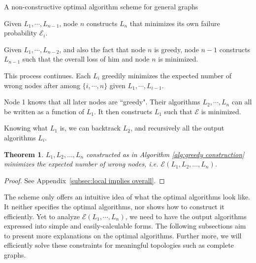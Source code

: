 \documentclass[a4paper,UKenglish]{lipics}
\newtheorem{thm}{Theorem}[section] %
\theoremstyle{definition}
\begin{document}
\begin{algorithm}[htb]
\caption{A non-constructive optimal algorithm scheme for general graphs}
\begin{algorithmic}[1]
\label{alg:greedy construction}
\STATE Given $L_1, \dotsb, L_{n-1}$, node $n$ constructs $L_n$ that minimizes its own failure probability $\mathcal{E}_i$.

\STATE Given $L_1, \dotsb, L_{n-2}$, and also the fact that node $n$ is greedy,
		 node $n - 1$ constructs $L_{n-1}$ such that the overall loss of him and node $n$ is minimized.

\STATE This process continues. Each $L_i$ greedily minimizes the expected number of wrong nodes after among $\{i, \dotsb, n\}$
		 given $L_1, \dotsb, L_{i-1}$. 

\STATE Node 1 knows that all later nodes are ``greedy".
	Their algorithms $L_2, \dotsb, L_n$ can all be written as a function of $L_1$. 
	It then constructs $L_1$ such that $\mathcal{E}$ is minimized.

\STATE Knowing what $L_1$ is, we can backtrack $L_2$, and recursively all the output algorithms $L_i$.
\end{algorithmic}
\end{algorithm}

\begin{thm}
\label{local implies overall}
$L_1, L_2, \dots, L_n$ constructed as in Algorithm \ref{alg:greedy construction} minimizes the expected number of wrong nodes, 
	i.e. $\mathcal{E}(L_1, L_2, \dots, L_n)$.
\end{thm}
\begin{proof}
See Appendix~\ref{subsec:local implies overall}.
\end{proof}

The scheme only offers an intuitive idea of what the optimal algorithms look like.
It neither specifies the optimal algorithms, nor shows how to construct it efficiently.  
Yet to analyze $\mathcal{E}(L_1, \dotsb, L_n)$, we need to have the output algorithms expressed into simple and easily-calculable forms. 
The following subsections aim to present more explanations on the optimal algorithms. 
Further more, we will efficiently solve these constraints for meaningful topologies such as complete graphs.
\end{document}
